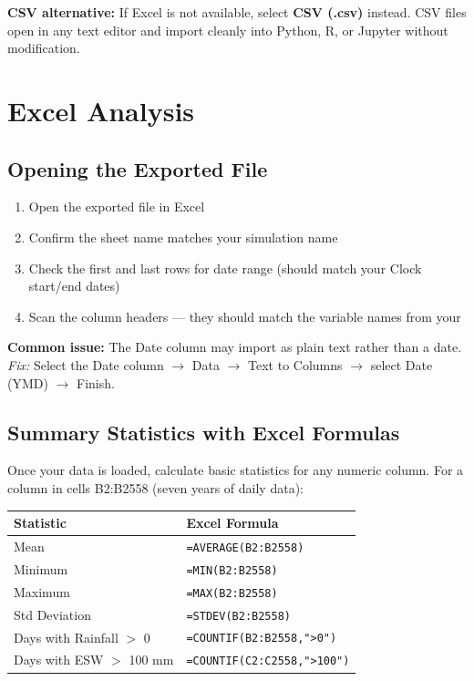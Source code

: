 \begin{tipbox}
\textbf{CSV alternative:} If Excel is not available, select \textbf{CSV (.csv)} instead. CSV files open in any text editor and import cleanly into Python, R, or Jupyter without modification.
\end{tipbox}

\section{Excel Analysis}

\subsection{Opening the Exported File}

\begin{enumerate}
  \item Open the exported  file in Excel
  \item Confirm the sheet name matches your simulation name
  \item Check the first and last rows for date range (should match your Clock start/end dates)
  \item Scan the column headers --- they should match the variable names from your 
\end{enumerate}

\begin{warningbox}
\textbf{Common issue:} The Date column may import as plain text rather than a date.\\
\textit{Fix:} Select the Date column $\to$ Data $\to$ Text to Columns $\to$ select Date (YMD) $\to$ Finish.
\end{warningbox}

\subsection{Summary Statistics with Excel Formulas}

Once your data is loaded, calculate basic statistics for any numeric column. For a column in cells B2:B2558 (seven years of daily data):

\begin{center}
\begin{tabular}{l|l}
\textbf{Statistic} & \textbf{Excel Formula} \\
\hline
Mean & \texttt{=AVERAGE(B2:B2558)} \\
Minimum & \texttt{=MIN(B2:B2558)} \\
Maximum & \texttt{=MAX(B2:B2558)} \\
Std Deviation & \texttt{=STDEV(B2:B2558)} \\
Days with Rainfall $>$ 0 & \texttt{=COUNTIF(B2:B2558,">0")} \\
Days with ESW $>$ 100 mm & \texttt{=COUNTIF(C2:C2558,">100")} \\
\end{tabular}
\end{center}

